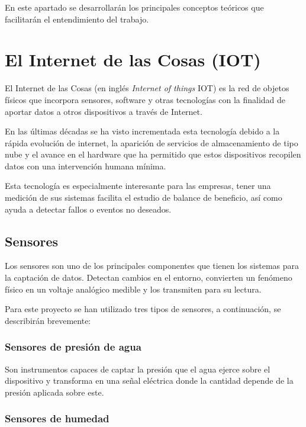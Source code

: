 
En este apartado se desarrollarán los principales conceptos teóricos que facilitarán el entendimiento del trabajo.

\section{El Internet de las Cosas (IOT)}

El Internet de las Cosas (en inglés \textit{Internet of things} IOT) es la red de objetos físicos que incorpora sensores, software y otras tecnologías con la finalidad de aportar datos a otros dispositivos a través de Internet.\cite{pagina:Oracle_IOT}

En las últimas décadas se ha visto incrementada esta tecnología debido a la rápida evolución de internet, la aparición de servicios de almacenamiento de tipo nube y el avance en el hardware que ha permitido que estos dispositivos recopilen datos con una intervención humana mínima.

Esta tecnología es especialmente interesante para las empresas, tener una medición de sus sistemas facilita el estudio de balance de beneficio, así como ayuda a detectar fallos o eventos no deseados. 

\subsection{Sensores}

Los sensores son uno de los principales componentes que tienen los sistemas para la captación de datos. Detectan cambios en el entorno, convierten un fenómeno físico en un voltaje analógico medible y los transmiten para su lectura. \cite{pagina:sensores}

Para este proyecto se han utilizado tres tipos de sensores, a continuación, se describirán brevemente:


\subsubsection{Sensores de presión de agua}

Son instrumentos capaces de captar la presión que el agua ejerce sobre el dispositivo y transforma en una señal eléctrica donde la cantidad depende de la presión aplicada sobre este. \cite{pagina:sensor_presion}


\subsubsection{Sensores de humedad}

